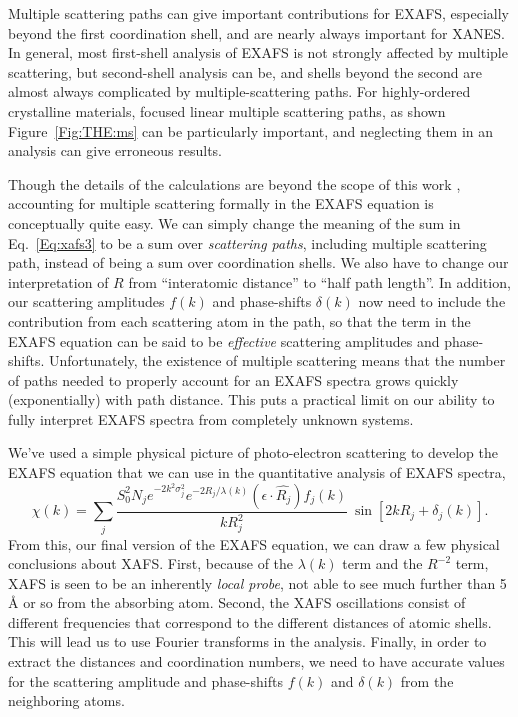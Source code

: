 Multiple scattering paths can give important contributions for EXAFS,
especially beyond the first coordination shell, and are nearly always
important for XANES.  In general, most first-shell analysis of EXAFS is not
strongly affected by multiple scattering, but second-shell analysis can be,
and shells beyond the second are almost always complicated by
multiple-scattering paths.  For highly-ordered crystalline materials,
focused linear multiple scattering paths, as shown Figure~\ref{Fig:THE:ms} can
be particularly important, and neglecting them in an analysis can give
erroneous results.

Though the details of the calculations are beyond the scope of this work
\cite{RehrAlbersRMP2000}, accounting for multiple scattering formally in
the EXAFS equation is conceptually quite easy.  We can simply change the
meaning of the sum in Eq.~\ref{Eq:xafs3} to be a sum over {\emph{scattering
    paths}}, including multiple scattering path, instead of being a sum
over coordination shells.  We also have to change our interpretation of $R$
from ``interatomic distance'' to ``half path length''.  In addition, our
scattering amplitudes $f(k)$ and phase-shifts $\delta(k)$ now need to
include the contribution from each scattering atom in the path, so that the
term in the EXAFS equation can be said to be {\emph{effective}} scattering
amplitudes and phase-shifts.  Unfortunately, the existence of multiple
scattering means that the number of paths needed to properly account for an
EXAFS spectra grows quickly (exponentially) with path distance.  This puts
a practical limit on our ability to fully interpret EXAFS spectra from
completely unknown systems.

We've used a simple physical picture of photo-electron scattering to
develop the EXAFS equation that we can use in the quantitative analysis of
EXAFS spectra,
\begin{equation}
  \chi(k) = \sum_j {
    {{\frac{S_0^2 N_j e^{-2k^2\sigma_j^2} e^{-2R_j/\lambda(k)}
 (\epsilon \cdot \hat{R_j}) f_j(k)}{kR_j^2}}}\>
    \sin[2kR_j + \delta_j(k)] }.
  \label{Eq:xafs_final}
\end{equation}
\noindent
From this, our final version of the EXAFS equation, we can draw a
few physical conclusions about XAFS.  First, because of the $\lambda(k)$
term and the $R^{-2}$ term, XAFS is seen to be an inherently \emph{local
  probe}, not able to see much further than 5 {\AA} or so from the
absorbing atom.   Second, the XAFS oscillations consist of different
frequencies that correspond to the different distances of atomic shells.
This will lead us to use Fourier transforms in the analysis.  Finally, in
order to extract the distances and coordination numbers, we need to have
accurate values for the scattering amplitude and phase-shifts $f(k)$ and
$\delta(k)$ from the neighboring atoms.


